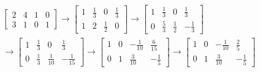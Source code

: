 \documentclass[11pt]{homework}
\begin{document}
\maketitle

    \question
    \begin{multline}
        \left[\begin{array}{cc|cc}
            2 & 4 & 1 & 0 \\ 
            3 & 1 & 0 & 1
        \end{array}\right]
        \to
        \left[\begin{array}{cc|cc}
            1 & \frac{1}{3} & 0 & \frac{1}{3} \\ 
            1 & 2 & \frac{1}{2} & 0
        \end{array}\right]
        \to
        \left[\begin{array}{cc|cc}
        1 & \frac{1}{3} & 0 & \frac{1}{3} \\ 
        0 & \frac{5}{3} & \frac{1}{2} & -\frac{1}{3}
        \end{array}\right]\\
        \to
        \left[\begin{array}{cc|cc}
        1 & \frac{1}{3} & 0 & \frac{1}{3} \\ 
        0 & \frac{1}{3} & \frac{1}{10} & -\frac{1}{15}
        \end{array}\right]
        \to
        \left[\begin{array}{cc|cc}
        1 & 0 & -\frac{1}{10} & \frac{6}{15} \\ 
        0 & 1 & \frac{3}{10} & -\frac{1}{5}
        \end{array}\right]
        \to
        \left[\begin{array}{cc|cc}
        1 & 0 & -\frac{1}{10} & \frac{2}{5} \\ 
        0 & 1 & \frac{3}{10} & -\frac{1}{5}
        \end{array}\right]
    \end{multline}
    \question
\end{document}
